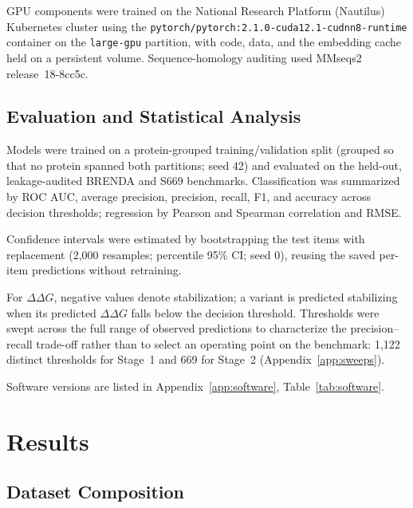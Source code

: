 \documentclass[journal,article,submit,moreauthors]{Definitions/mdpi}
\newcommand{\ddg}{\ensuremath{\Delta\Delta G}}
\begin{document}
GPU components were trained on the National Research Platform (Nautilus) Kubernetes cluster
using the \texttt{pytorch/pytorch:2.1.0-cuda12.1-cudnn8-runtime} container on the
\texttt{large-gpu} partition, with code, data, and the embedding cache held on a persistent
volume. Sequence-homology auditing used MMseqs2 release~18-8cc5c.

\subsection{Evaluation and Statistical Analysis}

Models were trained on a protein-grouped training/validation split (grouped so that no
protein spanned both partitions; seed 42) and evaluated on the held-out, leakage-audited
BRENDA and S669 benchmarks. Classification was summarized by ROC AUC, average precision,
precision, recall, F1, and accuracy across decision thresholds; regression by Pearson and
Spearman correlation and RMSE.

Confidence intervals were estimated by bootstrapping the test items with replacement
(2{,}000 resamples; percentile 95\% CI; seed 0), reusing the saved per-item predictions
without retraining.

For \ddg, negative values denote stabilization; a variant is predicted stabilizing when its
predicted \ddg{} falls below the decision threshold. Thresholds were swept across the full
range of observed predictions to characterize the precision--recall trade-off rather than
to select an operating point on the benchmark: 1{,}122 distinct thresholds for Stage~1 and
669 for Stage~2 (Appendix~\ref{app:sweeps}).

Software versions are listed in Appendix~\ref{app:software}, Table~\ref{tab:software}.

\section{Results}

\subsection{Dataset Composition}
\end{document}
